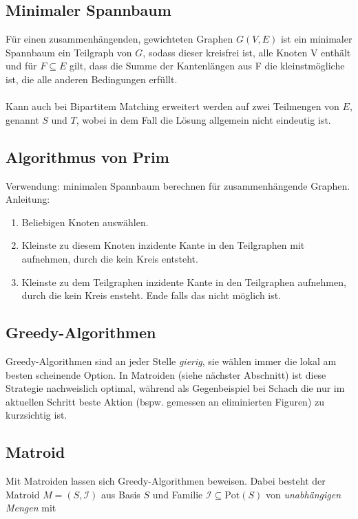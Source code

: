 \documentclass[11pt]{scrartcl}
\begin{document}
\subsection{Minimaler Spannbaum}
Für einen zusammenhängenden, gewichteten Graphen $G(V,E)$ ist ein minimaler Spannbaum ein Teilgraph von $G$, sodass dieser kreisfrei ist, alle Knoten V enthält und für $F \subseteq E$ gilt, dass die Summe der Kantenlängen aus F die kleinstmögliche ist, die alle anderen Bedingungen erfüllt. \\
\\
Kann auch bei Bipartitem Matching erweitert werden auf zwei Teilmengen von $E$, genannt $S$ und $T$, wobei in dem Fall die Lösung allgemein nicht eindeutig ist.

\subsection{Algorithmus von Prim}
Verwendung: minimalen Spannbaum berechnen für zusammenhängende Graphen.
Anleitung:
\begin{enumerate}
\item Beliebigen Knoten auswählen.
\item Kleinste zu diesem Knoten inzidente Kante in den Teilgraphen mit aufnehmen, durch die kein Kreis entsteht.
\item Kleinste zu dem Teilgraphen inzidente Kante in den Teilgraphen aufnehmen, durch die kein Kreis ensteht. Ende falls das nicht möglich ist.
\end{enumerate}
\subsection{Greedy-Algorithmen}

Greedy-Algorithmen sind an jeder Stelle \textit{gierig}, sie wählen immer die lokal am besten scheinende Option. In Matroiden (siehe nächster Abschnitt) ist diese Strategie nachweislich optimal, während als Gegenbeispiel bei Schach die nur im aktuellen Schritt beste Aktion (bspw. gemessen an eliminierten Figuren) zu kurzsichtig ist.

\subsection{Matroid}

Mit Matroiden lassen sich Greedy-Algorithmen beweisen. Dabei besteht der Matroid $M = (S, \mathcal{I})$ aus Basis $S$ und Familie $\mathcal{I} \subseteq \textrm{Pot}(S)$ von \textit{unabhängigen Mengen} mit
\end{document}
